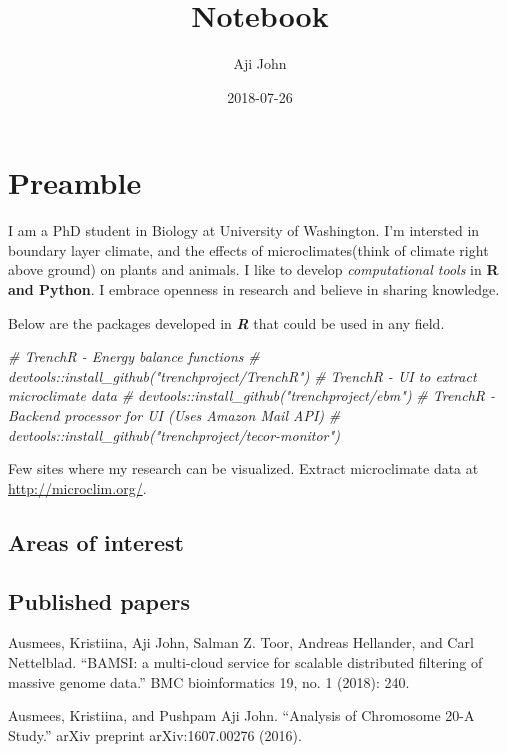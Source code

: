 \documentclass[]{book}
\title{Notebook}
\author{Aji John}
\date{2018-07-26}
\newenvironment{Shaded}{\begin{snugshade}}{\end{snugshade}}
\newcommand{\CommentTok}[1]{\textcolor[rgb]{0.56,0.35,0.01}{\textit{#1}}}
\theoremstyle{definition}
\theoremstyle{definition}
\theoremstyle{definition}
\theoremstyle{remark}
\begin{document}
\maketitle

{
\setcounter{tocdepth}{1}
\tableofcontents
}
\chapter{Preamble}\label{preamble}

I am a PhD student in Biology at University of Washington. I'm intersted
in boundary layer climate, and the effects of microclimates(think of
climate right above ground) on plants and animals. I like to develop
\emph{computational tools} in \textbf{R and Python}. I embrace openness
in research and believe in sharing knowledge.

Below are the packages developed in \emph{\textbf{R}} that could be used
in any field.

\begin{Shaded}
\begin{Highlighting}[]
\CommentTok{# TrenchR - Energy balance functions}
\CommentTok{# devtools::install_github("trenchproject/TrenchR")}
\CommentTok{# TrenchR - UI to extract microclimate data}
\CommentTok{# devtools::install_github("trenchproject/ebm")}
\CommentTok{# TrenchR - Backend processor for UI (Uses Amazon Mail API)}
\CommentTok{# devtools::install_github("trenchproject/tecor-monitor")}
\end{Highlighting}
\end{Shaded}

Few sites where my research can be visualized. Extract microclimate data
at \url{http://microclim.org/}.

\section{Areas of interest}\label{areas-of-interest}

\section{Published papers}\label{published-papers}

Ausmees, Kristiina, Aji John, Salman Z. Toor, Andreas Hellander, and
Carl Nettelblad. ``BAMSI: a multi-cloud service for scalable distributed
filtering of massive genome data.'' BMC bioinformatics 19, no. 1 (2018):
240.

Ausmees, Kristiina, and Pushpam Aji John. ``Analysis of Chromosome 20-A
Study.'' arXiv preprint arXiv:1607.00276 (2016).
\end{document}

